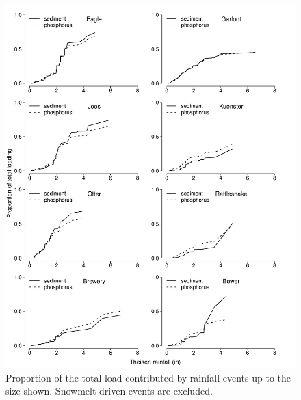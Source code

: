 \documentclass[10pt]{article}
\makeatletter
\def\maxwidth{ %
  \ifdim\Gin@nat@width>\linewidth
    \linewidth
  \else
    \Gin@nat@width
  \fi
}
\newenvironment{knitrout}{}{} %
\makeatother
\begin{document}
\begin{figure}
    \begin{center}
\begin{knitrout}
\color{fgcolor}\includegraphics[width=\maxwidth]{figure/figure2} 
\end{knitrout}

    \end{center}
    \caption{Proportion of the total load contributed by rainfall events up to the size shown. Snowmelt-driven events are excluded.\label{cdf}}
\end{figure}
\end{document}
